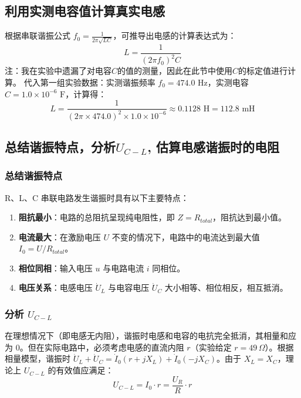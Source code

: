 \documentclass{article}
\begin{document}
\subsection{利用实测电容值计算真实电感}
根据串联谐振公式 $f_0 = \frac{1}{2\pi\sqrt{LC}}$，可推导出电感的计算表达式为：
\begin{equation}
L = \frac{1}{(2\pi f_0)^2 C}
\end{equation}
注：我在实验中遗漏了对电容$C$的值的测量，因此在此节中使用$C$的标定值进行计算。
代入第一组实验数据：实测谐振频率 $f_0 = 474.0\text{ Hz}$，实测电容 $C = 1.0 \times 10^{-6}\text{ F}$，计算得：
\begin{equation}
L = \frac{1}{(2\pi \times 474.0)^2 \times 1.0 \times 10^{-6}} \approx 0.1128\text{ H} = 112.8\text{ mH}
\end{equation}
\subsection{总结谐振特点，分析$U_{C-L}$, 估算电感谐振时的电阻}
\subsubsection{总结谐振特点}
R、L、C 串联电路发生谐振时具有以下主要特点：
\begin{enumerate}
    \item \textbf{阻抗最小}：电路的总阻抗呈现纯电阻性，即 $Z = R_{total}$，阻抗达到最小值。
    \item \textbf{电流最大}：在激励电压 $U$ 不变的情况下，电路中的电流达到最大值 $I_0 = U / R_{total}$。
    \item \textbf{相位同相}：输入电压 $u$ 与电路电流 $i$ 同相位。
    \item \textbf{电压关系}：电感电压 $\dot{U}_L$ 与电容电压 $\dot{U}_C$ 大小相等、相位相反，相互抵消。
\end{enumerate}

\subsubsection{分析 $U_{C-L}$}
在理想情况下（即电感无内阻），谐振时电感和电容的电抗完全抵消，其相量和应为 0。但在实际电路中，必须考虑电感的直流内阻 $r$（实验给定 $r=49\,\Omega$）。根据相量模型，谐振时 $\dot{U}_L + \dot{U}_C = \dot{I}_0(r + jX_L) + \dot{I}_0(-jX_C)$。由于 $X_L = X_C$，理论上 $U_{C-L}$ 的有效值应满足：
\begin{equation}
U_{C-L} = I_0 \cdot r = \frac{U_R}{R} \cdot r
\end{equation}
\end{document}
